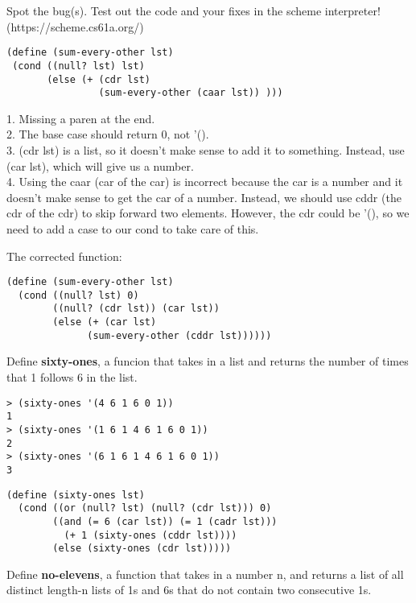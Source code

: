 \question
Spot the bug(s). Test out the code and your fixes in the scheme interpreter! (https://scheme.cs61a.org/)

\begin{lstlisting}
(define (sum-every-other lst)
 (cond ((null? lst) lst)
       (else (+ (cdr lst)
                (sum-every-other (caar lst)) )))
\end{lstlisting}

\begin{solution}[0.5in]
1. Missing a paren at the end. \\
2. The base case should return 0, not '(). \\
3. (cdr lst) is a list, so it doesn't make sense to add it to something. Instead, use (car lst), which will give us a number. \\
4. Using the caar (car of the car) is incorrect because the car is a number and it doesn't make sense to get the car of a number. Instead, we should use cddr (the cdr of the cdr) to skip forward two elements. However, the cdr could be '(), so we need to add a case to our cond to take care of this.

The corrected function:
\begin{verbatim}
(define (sum-every-other lst)
  (cond ((null? lst) 0)
        ((null? (cdr lst)) (car lst))
        (else (+ (car lst)
              (sum-every-other (cddr lst))))))
\end{verbatim}
\end{solution}

\question
Define \textbf{sixty-ones}, a funcion that takes in a list and returns the number of times that 1 follows 6 in the list.

\begin{lstlisting}
> (sixty-ones '(4 6 1 6 0 1))
1
> (sixty-ones '(1 6 1 4 6 1 6 0 1))
2
> (sixty-ones '(6 1 6 1 4 6 1 6 0 1))
3
\end{lstlisting}

\begin{solution}[0.5in]
\begin{verbatim}
(define (sixty-ones lst)
  (cond ((or (null? lst) (null? (cdr lst))) 0)
        ((and (= 6 (car lst)) (= 1 (cadr lst)))
          (+ 1 (sixty-ones (cddr lst))))
        (else (sixty-ones (cdr lst)))))
\end{verbatim}
\end{solution}

\question
Define \textbf{no-elevens}, a function that takes in a number n, and returns a list of all distinct length-n lists of 1s and 6s that do not contain two consecutive 1s.

